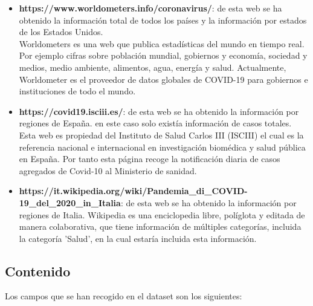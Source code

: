 \documentclass[]{article}
\providecommand{\tightlist}{%
  \setlength{\itemsep}{0pt}\setlength{\parskip}{0pt}}
\begin{document}
\begin{itemize}
\tightlist
\item
  \textbf{https://www.worldometers.info/coronavirus/}: de esta web se ha obtenido la información total de todos los países y la información por estados de los Estados Unidos.\\
	Worldometers es una web que publica estadísticas del mundo en tiempo real. Por ejemplo cifras sobre población mundial, gobiernos y economía, sociedad y medios, medio ambiente, alimentos, agua, energía y salud. Actualmente, Worldometer es el proveedor de datos globales de COVID-19 para gobiernos e instituciones de todo el mundo.\\  
\item
  \textbf{https://covid19.isciii.es/}: de esta web se ha obtenido la información por regiones de España. en este caso solo existía información de casos totales.\\
  Esta web es propiedad del Instituto de Salud Carlos III (ISCIII) el cual es la referencia nacional e internacional en investigación biomédica y salud pública en España. Por tanto esta página recoge la notificación diaria de casos agregados de Covid-10 al Ministerio de sanidad.\\
\item
  \textbf{https://it.wikipedia.org/wiki/Pandemia\_di\_COVID-19\_del\_2020\_in\_Italia}: de esta web se ha obtenido la información por regiones de Italia.
	Wikipedia es una enciclopedia libre, políglota y editada de manera colaborativa, que tiene información de múltiples categorías, incluida la categoría 'Salud', en la cual estaría incluida esta información.\\  
\end{itemize}

\newpage

\hypertarget{contenido}{%
\subsection{Contenido}\label{contenido}}
Los campos que se han recogido en el dataset son los siguientes:
\end{document}
